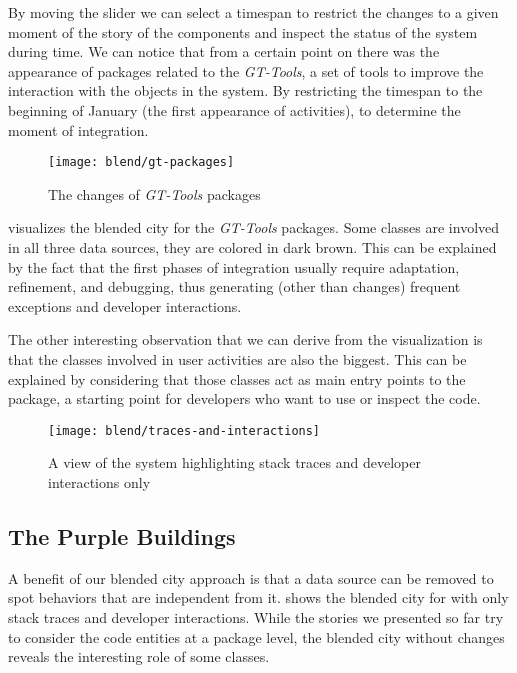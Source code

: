 By moving the slider we can select a timespan to restrict the changes to a given moment of the story of the components and inspect the status of the system during time.
We can notice that from a certain point on there was the appearance of packages related to the \emph{GT-Tools}, a set of tools to improve the interaction with the objects in the system.
By restricting the timespan to the beginning of January (\ie the first appearance of activities), to determine the moment of integration.

\begin{figure}[h]
\centering
\texttt{[image: blend/gt-packages]}
\caption{The changes of \textit{GT-Tools} packages}
\label{fig:gt-spotter-packages}
\end{figure}

 visualizes the blended city for the \emph{GT-Tools} packages.
Some classes are involved in all three data sources, \ie they are colored in dark brown.
This can be explained by the fact that the first phases of integration usually require adaptation, refinement, and debugging, thus generating (other than changes) frequent exceptions and developer interactions.

The other interesting observation that we can derive from the visualization is that the  classes involved in user activities are also the biggest.
This can be explained by considering that those classes act as main entry points to the package, a starting point for developers who want to use or inspect the code.


\begin{figure*}[ht]
\centering
\texttt{[image: blend/traces-and-interactions]}
\caption{A view of the system highlighting stack traces and developer interactions only}
\label{fig:traces-and-interactions}
\end{figure*}

\subsection{The Purple Buildings}

A benefit of our blended city approach is that a data source can be removed to spot behaviors that are independent from it.
 shows the blended city for \pha with only stack traces and developer interactions.
While the stories we presented so far try to consider the code entities at a package level,  the blended city without changes reveals the interesting role of some classes.

